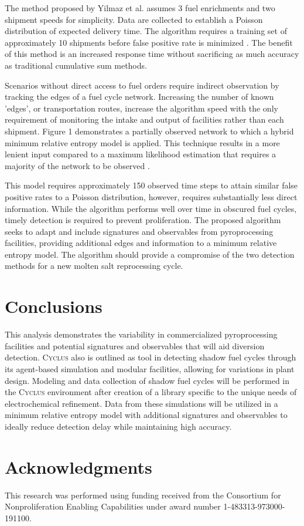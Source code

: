 \documentclass{anstrans}
\newcommand{\Cyclus}{\textsc{Cyclus}\xspace}%
\begin{document}
The method proposed by Yilmaz et al. assumes 3 fuel enrichments and two shipment speeds for simplicity. Data are collected to establish a Poisson distribution of expected delivery time. The algorithm requires a training set of approximately 10 shipments before false positive rate is minimized \cite{Yilmaz_2016}. The benefit of this method is an increased response time without sacrificing as much accuracy as traditional cumulative sum methods. 

Scenarios without direct access to fuel orders require indirect observation by tracking the edges of a fuel cycle network. Increasing the number of known 'edges', or transportation routes, increase the algorithm speed with the only requirement of monitoring the intake and output of facilities rather than each shipment. Figure 1 demonstrates a partially observed network to which a hybrid minimum relative entropy model is applied. This technique results in a more lenient input compared to a maximum likelihood estimation that requires a majority of the network to be observed \cite{Hou_2016}.


This model requires approximately 150 observed time steps to attain similar false positive rates to a Poisson distribution, however, requires substantially less direct information. While the algorithm performs well over time in obscured fuel cycles, timely detection is required to prevent proliferation. The proposed algorithm seeks to adapt and include signatures and observables from pyroprocessing facilities, providing additional edges and information to a minimum relative entropy model. The algorithm should provide a compromise of the two detection methods for a new molten salt reprocessing cycle.

\section{Conclusions}
This analysis demonstrates the variability in commercialized pyroprocessing facilities and potential signatures and observables that will aid diversion detection. \Cyclus also is outlined as tool in detecting shadow fuel cycles through its agent-based simulation and modular facilities, allowing for variations in plant design. Modeling and data collection of shadow fuel cycles will be performed in the \Cyclus environment after creation of a library specific to the unique needs of electrochemical refinement. Data from these simulations will be utilized in a minimum relative entropy model with additional signatures and observables to ideally reduce detection delay while maintaining high accuracy.

\section{Acknowledgments}
This research was performed using funding received from the Consortium for Nonproliferation Enabling Capabilities under award number 1-483313-973000-191100.



\end{document}
